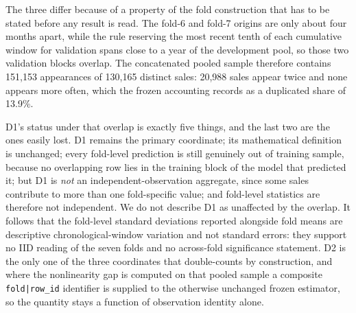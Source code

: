 \documentclass[10pt]{article}
\theoremstyle{definition}
\newcommand{\1}{\mathbf{1}}
\begin{document}
The three differ because of a property of the fold construction that has to be
stated before any result is read. The fold-6 and fold-7 origins are only about four months
apart, while the rule reserving the most recent tenth of each cumulative window for
validation spans close to a year of the development pool, so those two validation blocks
overlap. The concatenated pooled sample therefore contains 151,153 appearances of 130,165
distinct sales: 20,988 sales appear twice and none appears more often, which the frozen
accounting records as a duplicated share of 13.9\%.

D1's status under that overlap is exactly five things, and the last two are the
ones easily lost. D1 remains the primary coordinate; its mathematical definition is
unchanged; every fold-level prediction is still genuinely out of training sample, because
no overlapping row lies in the training block of the model that predicted it; but D1 is
\emph{not} an independent-observation aggregate, since some sales contribute to more than
one fold-specific value; and fold-level statistics are therefore not independent. We do
not describe D1 as unaffected by the overlap. It follows that the fold-level standard
deviations reported alongside fold means are descriptive chronological-window variation
and not standard errors: they support no IID reading of the seven folds and no across-fold
significance statement. D2 is the only one of the three coordinates that double-counts by
construction, and where the nonlinearity gap is computed on that pooled sample a composite
\texttt{fold|row\_id} identifier is supplied to the otherwise unchanged frozen estimator,
so the quantity stays a function of observation identity alone.
\end{document}
